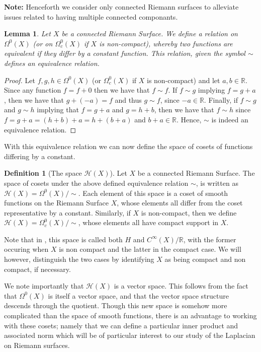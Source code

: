 \documentclass[11pt]{report}
\newtheorem{lemma}[thm]{Lemma}
\theoremstyle{definition}
\newtheorem{defn}[thm]{Definition}
\begin{document}
\textbf{Note:} Henceforth we consider only connected Riemann surfaces to alleviate  issues related to having multiple connected componants.

\begin{lemma}
  Let $X$ be a connected Riemann Surface. We define a relation on $\Omega^0(X)$ (or on $\Omega^0_c(X)$ if $X$ is non-compact), whereby two functions are equivalent if they differ by a constant function. This relation, given the symbol $\sim$ defines an equivalence relation.
\end{lemma}

\begin{proof}
  Let $f,g,h \in \Omega^0(X)$ (or $\Omega^0_c(X)$ if $X$ is non-compact) and let $a, b \in \mathbb{R}$. Since any function $f = f + 0$ then we have that $f \sim f$. If $f \sim g$ implying $f = g + a$, then we have that $g + (-a) = f$ and thus $g \sim f$, since $-a \in \mathbb{R}$. Finally, if $f \sim g$ and $g \sim h$ implying that $f = g + a$ and $g = h + b$, then we have that $f \sim h$ since $f = g + a = (h + b) + a = h + (b + a)$ and $b+a \in \mathbb{R}$. Hence, $\sim$ is indeed an equivalence relation. 
\end{proof}

With this equivalence relation we can now define the space of cosets of functions differing by a constant.

\begin{defn}[The space $\mathcal{H}(X)$]
  Let $X$ be a connected Riemann Surface. The space of cosets under the above defined equivalence relation $\sim$, is written as $\mathcal{H}(X) = \Omega^0(X)/\sim$. Each element of this space is a coset of smooth functions on the Riemann Surface $X$, whose elements all differ from the coset representative by a constant. 
  Similarly, if $X$ is non-compact, then we define $\mathcal{H}(X) = \Omega^0_c(X)/\sim$, whose elements all have compact support in $X$.
\end{defn}

Note that in \cite{donaldson}, this space is called both $H$ and $C^{\infty}(X)/\mathbb{R}$, with the former occuring when $X$ is non compact and the latter in the compact case. We will however, distinguish the two cases by identifying $X$ as being compact and non compact, if necessary.

We note importantly that $\mathcal{H}(X)$ is a vector space. This follows from the fact that $\Omega^0(X)$ is itself a vector space, and that the vector space structure descends through the quotient. Though this new space is somehow more complicated than the space of smooth functions, there is an advantage to working with these cosets; namely that we can define a particular inner product and associated norm which will be of particular interest to our study of the Laplacian on Riemann surfaces.
\end{document}
